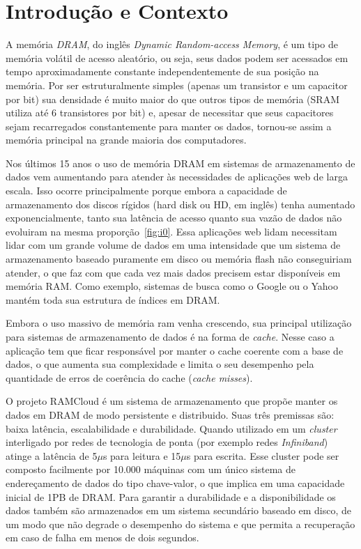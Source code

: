 \chapter{Introdução e Contexto}
A memória \emph{DRAM}, do inglês \emph{Dynamic Random-access Memory}, é um tipo de memória volátil de acesso aleatório, ou seja, seus dados podem ser acessados
em tempo aproximadamente constante independentemente de sua posição na memória. Por ser estruturalmente simples (apenas um transistor e um capacitor por bit) sua densidade é muito maior do que outros tipos de memória (SRAM utiliza até 6 transistores por bit) e, apesar de necessitar que seus capacitores sejam recarregados constantemente para manter os dados, tornou-se assim a memória principal na grande maioria dos computadores.

Nos últimos 15 anos o uso de memória DRAM em sistemas de armazenamento de dados vem aumentando para atender às necessidades de aplicações web de larga escala. Isso
ocorre principalmente porque embora a capacidade de armazenamento dos discos rígidos (hard disk ou HD, em inglês) tenha aumentado exponencialmente, tanto sua latência de acesso quanto sua vazão de dados não evoluiram na mesma proporção~\ref{fig:i0}. Essa aplicações web lidam necessitam lidar com um grande volume de dados em uma intensidade que um sistema de armazenamento baseado puramente em disco ou memória flash não conseguiriam atender, o que faz com que cada vez mais dados precisem estar disponíveis em memória RAM. Como exemplo, sistemas de busca como o Google ou o Yahoo mantém toda sua estrutura de índices em DRAM.

Embora o uso massivo de memória ram venha crescendo, sua principal utilização para sistemas de armazenamento de dados é na forma de \emph{cache}. Nesse caso a aplicação tem que ficar responsável por manter o cache coerente com a base de dados, o que aumenta sua complexidade e limita o seu desempenho pela quantidade de erros de coerência do cache (\emph{cache misses}).

O projeto RAMCloud é um sistema de armazenamento que propõe manter os dados em DRAM de modo persistente e distribuido. Suas três premissas são: baixa latência, escalabilidade e durabilidade. Quando utilizado em um \emph{cluster} interligado por redes de tecnologia de ponta (por exemplo redes \emph{Infiniband}) atinge a latência de 5$\mu$s para leitura e 15$\mu$s para escrita. Esse cluster pode ser composto facilmente por 10.000 máquinas com um único sistema de endereçamento de 
dados do tipo chave-valor, o que implica em uma capacidade inicial de 1PB de DRAM. Para garantir a durabilidade e a disponibilidade os dados também são armazenados em um sistema secundário baseado em disco, de um modo que não degrade o desempenho do sistema e que permita a recuperação em caso de falha em menos de dois segundos. 

